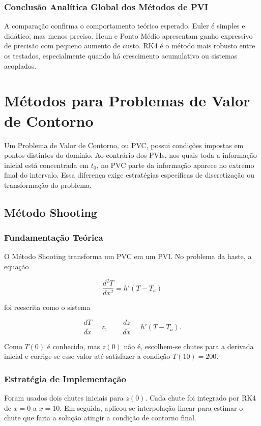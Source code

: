 \subsubsection{Conclusão Analítica Global dos Métodos de PVI}

A comparação confirma o comportamento teórico esperado. Euler é simples e didático, mas menos preciso. Heun e Ponto Médio apresentam ganho expressivo de precisão com pequeno aumento de custo. RK4 é o método mais robusto entre os testados, especialmente quando há crescimento acumulativo ou sistemas acoplados.

\section{Métodos para Problemas de Valor de Contorno}

Um Problema de Valor de Contorno, ou PVC, possui condições impostas em pontos distintos do domínio. Ao contrário dos PVIs, nos quais toda a informação inicial está concentrada em \(t_0\), no PVC parte da informação aparece no extremo final do intervalo. Essa diferença exige estratégias específicas de discretização ou transformação do problema.

\subsection{Método Shooting}

\subsubsection{Fundamentação Teórica}

O Método Shooting transforma um PVC em um PVI. No problema da haste, a equação

\[
    \frac{d^2T}{dx^2}=h'(T-T_a)
\]

foi reescrita como o sistema

\[
    \frac{dT}{dx}=z, \qquad \frac{dz}{dx}=h'(T-T_a).
\]

Como \(T(0)\) é conhecido, mas \(z(0)\) não é, escolhem-se chutes para a derivada inicial e corrige-se esse valor até satisfazer a condição \(T(10)=200\).

\subsubsection{Estratégia de Implementação}

Foram usados dois chutes iniciais para \(z(0)\). Cada chute foi integrado por RK4 de \(x=0\) a \(x=10\). Em seguida, aplicou-se interpolação linear para estimar o chute que faria a solução atingir a condição de contorno final.

